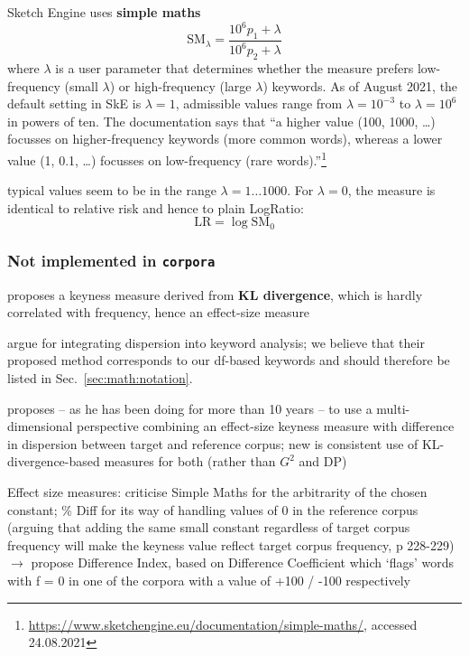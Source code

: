 \documentclass[a4paper]{article}
\newcommand{\SM}[1][\lambda]{\text{SM}_{#1}} %
\newcommand{\LR}{\text{LR}}     %
\begin{document}
Sketch Engine uses \textbf{simple maths} \citep{Kilgarriff:09}
\begin{equation}
  \label{eq:simple-maths}
  \SM = \frac{10^6 p_1 + \lambda}{10^6 p_2 + \lambda}
\end{equation}
where $\lambda$ is a user parameter that determines whether the measure prefers low-frequency (small $\lambda$) or high-frequency (large $\lambda$) keywords. As of August 2021, the default setting in SkE is $\lambda = 1$, admissible values range from $\lambda = 10^{-3}$ to $\lambda = 10^6$ in powers of ten. The documentation says that ``a higher value (100, 1000, \ldots) focusses on higher-frequency keywords (more common words), whereas a lower value (1, 0.1, \ldots) focusses on low-frequency (rare words).''\footnote{\url{https://www.sketchengine.eu/documentation/simple-maths/}, accessed 24.08.2021}

typical values seem to be in the range $\lambda = 1 \ldots 1000$.  For $\lambda = 0$, the measure is identical to relative risk and hence to plain LogRatio:
\[
  \LR = \log \SM[0]
\]

\subsubsection{Not implemented in \texttt{corpora}}
\label{sec:key:nyi}

\citet{Gries:21} proposes a keyness measure derived from \textbf{KL divergence}, which is hardly correlated with frequency, hence an effect-size measure

\citet{Egbert:Biber:19} argue for integrating dispersion into keyword analysis; we believe that their proposed method corresponds to our df-based keywords \citep{Evert:Dykes:Peters:18} and should therefore be listed in Sec.~\ref{sec:math:notation}.

\citet{Gries:21} proposes -- as he has been doing for more than 10 years -- to use a multi-dimensional perspective combining an effect-size keyness measure with difference in dispersion between target and reference corpus; new is consistent use of KL-divergence-based measures for both (rather than $G^2$ and DP)

Effect size measures: \citet{Fidler:15} criticise Simple Maths for the arbitrarity of the chosen constant; \% Diff for its way of handling values of 0 in the reference corpus (arguing that adding the same small constant regardless of target corpus frequency will make the keyness value reflect target corpus frequency, p 228-229) $\rightarrow$ propose Difference Index, based on Difference Coefficient which `flags' words with f = 0 in one of the corpora with a value of +100 / -100 respectively
\end{document}
